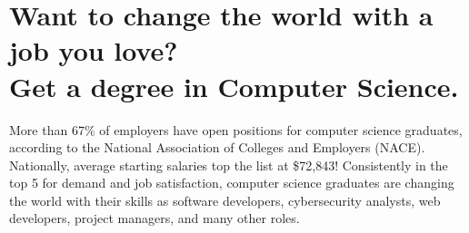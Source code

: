 %
\section*{Want to change the world with a job you love?\\
Get a degree in Computer Science.}
More than 67\% of employers have open positions for computer science graduates, according to the National Association of Colleges and Employers (NACE). Nationally, average starting salaries top the list at \$72,843! Consistently in the top 5 for demand and job satisfaction, computer science graduates are changing the world with their skills as software developers, cybersecurity analysts, web developers, project managers, and many other roles.


